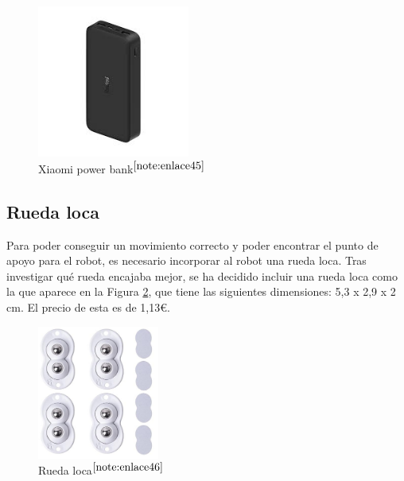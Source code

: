 \begin{figure} [h!]
	\begin{center}
		\includegraphics[width=5cm]{figs/powerbank.png}
	\end{center}
	\caption{Xiaomi power bank$^{\ref{note:enlace45}}$} 
	\label{fig:powerbank}
\end{figure}

\setcounter{footnote}{45} %

\subsection{Rueda loca}
\label{subsec:ruedaloca}

Para poder conseguir un movimiento correcto y poder encontrar el punto de apoyo para el robot, es necesario incorporar al robot una rueda loca. Tras investigar qué rueda encajaba mejor, se ha decidido incluir una rueda loca como la que aparece en la Figura \ref{fig:ruedaloca}, que tiene las siguientes dimensiones: 5,3 x 2,9 x 2 cm. El precio de esta es de 1,13€.

\begin{figure} [h!]
	\begin{center}
		\includegraphics[width=4cm]{figs/ruedaloca.png}
	\end{center}
	\caption{Rueda loca$^{\ref{note:enlace46}}$} 
	\label{fig:ruedaloca}
\end{figure}

